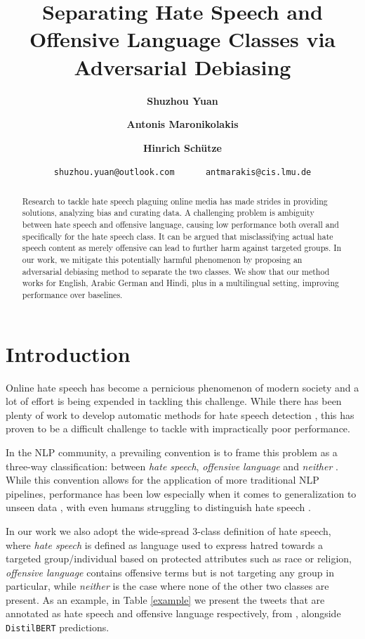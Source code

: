 \documentclass[11pt]{article}
\title{\textbf{Separating Hate Speech and Offensive Language Classes via Adversarial Debiasing}}
\author{\textbf{Shuzhou Yuan} \and
\textbf{Antonis Maronikolakis} \and
\textbf{Hinrich Schütze}
}
\date{\texttt{shuzhou.yuan@outlook.com} ~~~~~ \texttt{antmarakis@cis.lmu.de}}
\begin{document}
	\maketitle
	\begin{abstract}
		
		Research to tackle hate speech plaguing online media has made strides in providing solutions, analyzing bias and curating data. A challenging problem is ambiguity between hate speech and offensive language, causing low performance both overall and specifically for the hate speech class. It can be argued that misclassifying actual hate speech content as merely offensive can lead to further harm against targeted groups. In our work, we mitigate this potentially harmful phenomenon by proposing an adversarial debiasing method to separate the two classes. We show that our method works for English, Arabic German and Hindi, plus in a multilingual setting, improving performance over baselines.
		
	\end{abstract}
	
	\section{Introduction}\label{intro}
	
	Online hate speech has become a pernicious phenomenon of modern society and a lot of effort is being expended in tackling this challenge. While there has been plenty of work to develop automatic methods for hate speech detection \cite{schmidt2017survey}, this has proven to be a difficult challenge to tackle with impractically poor performance.
	
	In the NLP community, a prevailing convention is to frame this problem as a three-way classification: between \textit{hate speech}, \textit{offensive language} and \textit{neither} \cite{davidson,mulki-etal-2019-l,founta,mubarak-etal-2017-abusive,mathur-etal-2018-offend}. While this convention allows for the application of more traditional NLP pipelines, performance has been low \cite{mozafari2019bert,davidson} especially when it comes to generalization to unseen data \cite{hate_speech_cross_dataset}, with even humans struggling to distinguish hate speech \cite{chatzakou2017mean,are_you_racist}.
	
	In our work we also adopt the wide-spread 3-class definition of hate speech, where \textit{hate speech} is defined as language used to express hatred towards a targeted group/individual based on protected attributes such as race or religion, \textit{offensive language} contains offensive terms but is not targeting any group in particular, while \textit{neither} is the case where none of the other two classes are present. As an example, in Table \ref{example} we present the tweets that are annotated as hate speech and offensive language respectively, from \citet{davidson}, alongside \texttt{DistilBERT} predictions.
	
\end{document}
